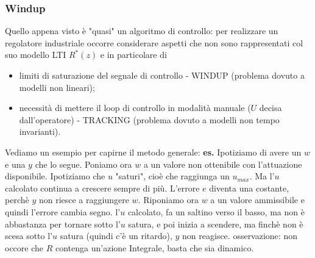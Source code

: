\begin{landscape}
\begin{multicols*}{2}
    \subsubsection{Windup}
    Quello appena visto è "quasi" un algoritmo di controllo: per realizzare un regolatore industriale occorre considerare aspetti che non sono rappresentati col suo modello LTI $R^*(z)$ e in particolare di 
    \begin{itemize}
        \item limiti di saturazione del segnale di controllo - WINDUP (problema dovuto a modelli non lineari);
        \item necessità di mettere il loop di controllo in modalità manuale ($U$ decisa dall'operatore) - TRACKING (problema dovuto a modelli non tempo invarianti).
    \end{itemize}
    Vediamo un esempio per capirne il metodo generale:\newline
    \textbf{es.}\newline
    Ipotiziamo di avere un $w$ e una $y$ che lo segue.\newline
    Poniamo ora $w$ a un valore non ottenibile con l'attuazione disponibile.\newline
    Ipotiziamo che $u$ "saturi", cioè che raggiunga un $u_{max}$.\newline
    Ma l'$u$ calcolato continua a crescere sempre di più.\newline
    L'errore $e$ diventa una costante, perchè $y$ non riesce a raggiungere $w$.\newline
    Riponiamo ora $w$ a un valore ammissibile e quindi l'errore cambia segno.\newline
    l'$u$ calcolato, fa un saltino verso il basso, ma non è abbastanza per tornare sotto l'$u$ satura, e poi inizia a scendere, ma finchè non è scesa sotto l'$u$ satura (quindi c'è un ritardo), $y$ non reagisce.\newline
    \newline
    osservazione: non occore che $R$ contenga un'azione Integrale, basta che sia dinamico.

\end{multicols*}
\end{landscape}
